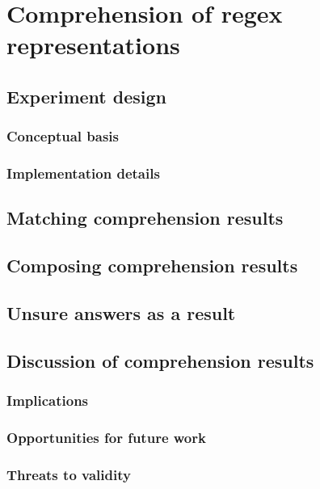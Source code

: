 \chapter{Comprehension of regex representations}
\section{Experiment design}
\subsection{Conceptual basis}
\subsection{Implementation details}

\section{Matching comprehension results}
\section{Composing comprehension results}
\section{Unsure answers as a result}

\section{Discussion of comprehension results}
\subsection{Implications}
\subsection{Opportunities for future work}
\subsection{Threats to validity}
